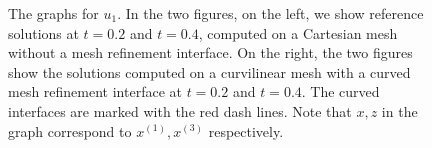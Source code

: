 \begin{figure}[htbp]
\caption{The graphs for $u_1$. In the two figures, on the left, we show reference solutions at $t=0.2$ and $t=0.4$, computed on a Cartesian mesh without a mesh refinement interface. On the right, the two figures show the solutions computed on a curvilinear mesh with a curved mesh refinement interface at $t=0.2$ and $t=0.4$. The curved interfaces are marked with the red dash lines. Note that $x,z$ in the graph correspond to $x^{(1)}, x^{(3)}$ respectively.}
\label{u1}
\end{figure}


